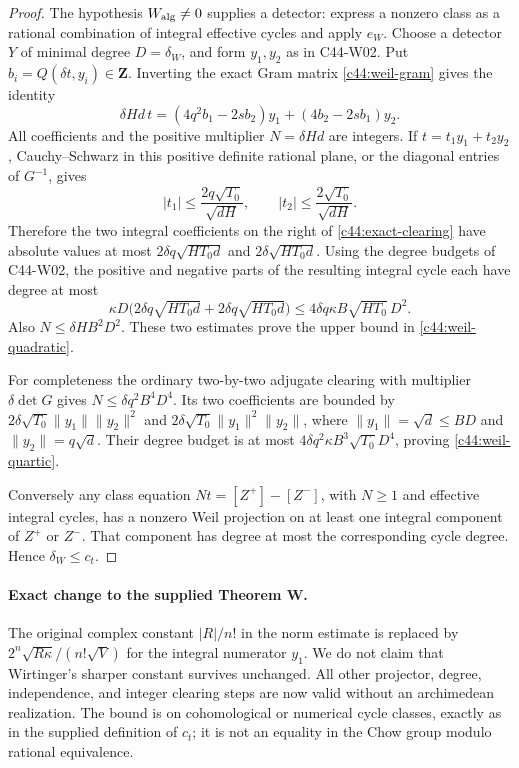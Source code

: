\documentclass[11pt]{article}
\theoremstyle{remark}\newtheorem{remark}[theorem]{Remark}
\begin{document}
\begin{proof}
The hypothesis $W_{\rm alg}\ne0$ supplies a detector: express a
nonzero class as a rational combination of integral effective
cycles and apply $e_W$.  Choose a detector $Y$ of minimal degree
$D=\delta_W$, and form $y_1,y_2$ as in C44-W02.  Put
$b_i=Q(\delta t,y_i)\in\mathbf Z$.  Inverting the exact Gram matrix
\eqref{c44:weil-gram} gives the identity
\begin{equation}\label{c44:exact-clearing}
 \delta Hd\,t=(4q^2b_1-2sb_2)y_1+(4b_2-2sb_1)y_2.
\end{equation}
All coefficients and the positive multiplier $N=\delta Hd$ are
integers.  If $t=t_1y_1+t_2y_2$, Cauchy--Schwarz in this
positive definite rational plane, or the diagonal entries of
$G^{-1}$, gives
\[
 |t_1|\leq\frac{2q\sqrt{T_0}}{\sqrt{dH}},\qquad
 |t_2|\leq\frac{2\sqrt{T_0}}{\sqrt{dH}}.
\]
Therefore the two integral coefficients on the right of
\eqref{c44:exact-clearing} have absolute values at most
$2\delta q\sqrt{HT_0d}$ and $2\delta\sqrt{HT_0d}$.
Using the degree budgets of C44-W02, the positive and negative
parts of the resulting integral cycle each have degree at most
\[
 \kappa D\bigl(2\delta q\sqrt{HT_0d}
                     +2\delta q\sqrt{HT_0d}\bigr)
 \leq4\delta q\kappa B\sqrt{HT_0}\,D^2.
\]
Also $N\leq\delta HB^2D^2$.  These two estimates prove the
upper bound in \eqref{c44:weil-quadratic}.

For completeness the ordinary two-by-two adjugate clearing with
multiplier $\delta\det G$ gives
$N\leq\delta q^2B^4D^4$.  Its two coefficients are bounded by
$2\delta\sqrt{T_0}\|y_1\|\|y_2\|^2$ and
$2\delta\sqrt{T_0}\|y_1\|^2\|y_2\|$, where
$\|y_1\|=\sqrt d\leq BD$ and $\|y_2\|=q\sqrt d$.
Their degree budget is at most
$4\delta q^2\kappa B^3\sqrt{T_0}D^4$, proving
\eqref{c44:weil-quartic}.

Conversely any class equation
$Nt=[Z^+]-[Z^-]$, with $N\geq1$ and effective integral cycles,
has a nonzero Weil projection on at least one integral component
of $Z^+$ or $Z^-$.  That component has degree at most the
corresponding cycle degree.  Hence $\delta_W\leq c_t$.
\end{proof}

\paragraph{Exact change to the supplied Theorem W.}
The original complex constant $|R|/n!$ in the norm estimate is
replaced by $2^n\sqrt{R\kappa}/(n!\sqrt V)$ for the integral numerator
$y_1$.  We do not claim that Wirtinger's sharper constant survives
unchanged.  All other projector, degree, independence, and integer
clearing steps are now valid without an archimedean realization.
The bound is on cohomological or numerical cycle classes, exactly
as in the supplied definition of $c_t$; it is not an equality in
the Chow group modulo rational equivalence.
\end{document}
